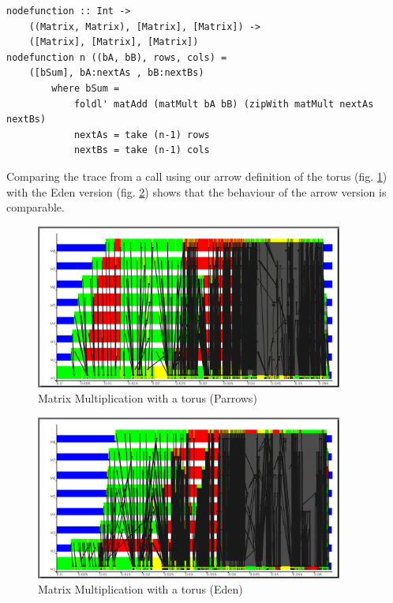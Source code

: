 \begin{lstlisting}[frame=htrbl]
nodefunction :: Int ->
	((Matrix, Matrix), [Matrix], [Matrix]) ->
	([Matrix], [Matrix], [Matrix])
nodefunction n ((bA, bB), rows, cols) =
	([bSum], bA:nextAs , bB:nextBs)
		where bSum =
			foldl' matAdd (matMult bA bB) (zipWith matMult nextAs nextBs)
			nextAs = take (n-1) rows
			nextBs = take (n-1) cols
\end{lstlisting}
Comparing the trace from a call using our arrow definition of the torus (fig. \ref{fig:torus_parrows_trace}) with the Eden version (fig. \ref{fig:torus_eden_trace}) shows that the behaviour of the arrow version is comparable.
\begin{figure}[ht]
	\centering
	\includegraphics[width=0.9\textwidth]{images/torus_matrix_parrows_scale}
	\caption[Matrix Multiplication with a torus (Parrows)]{Matrix Multiplication with a torus (Parrows)}
	\label{fig:torus_parrows_trace}
\end{figure}

\begin{figure}[ht]
	\centering
	\includegraphics[width=0.9\textwidth]{images/torus_matrix_eden_scale}
	\caption[Matrix Multiplication with a torus (Eden)]{Matrix Multiplication with a torus (Eden)}
	\label{fig:torus_eden_trace}
\end{figure}